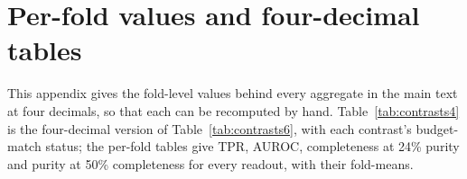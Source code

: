 \section{Per-fold values and four-decimal tables}
\label{app:perfold}

This appendix gives the fold-level values behind every aggregate in the main text at four
decimals, so that each can be recomputed by hand. Table~\ref{tab:contrasts4} is the four-decimal
version of Table~\ref{tab:contrasts6}, with each contrast's budget-match status; the per-fold
tables give TPR, AUROC, completeness at 24\% purity and purity at 50\% completeness for every
readout, with their fold-means.




